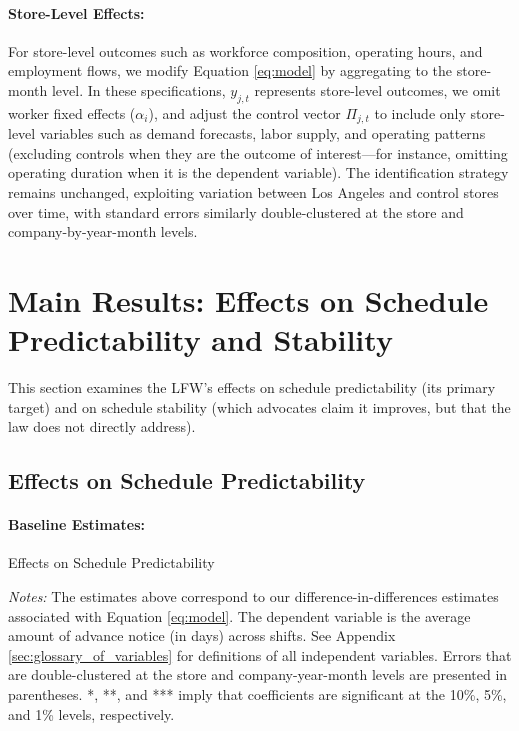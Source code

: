 \documentclass[letterpaper,11pt,leqno]{article}
\theoremstyle{paper}
\newcommand{\note}[2][]{\parbox{\textwidth}{\footnotesize\vspace*{10pt}\textit{#1}#2}}
\begin{document}
\paragraph{Store-Level Effects:}
For store-level outcomes such as workforce composition, operating hours, and employment flows, we modify Equation \ref{eq:model} by aggregating to the store-month level. In these specifications, $y_{j,t}$ represents store-level outcomes, we omit worker fixed effects ($\alpha_i$), and adjust the control vector $\Pi_{j,t}$ to include only store-level variables such as demand forecasts, labor supply, and operating patterns (excluding controls when they are the outcome of interest—for instance, omitting operating duration when it is the dependent variable). The identification strategy remains unchanged, exploiting variation between Los Angeles and control stores over time, with standard errors similarly double-clustered at the store and company-by-year-month levels.


\section{Main Results: Effects on Schedule Predictability and Stability} \label{sec:main_results}

This section examines the LFW's effects on schedule predictability (its primary target) and on schedule stability (which advocates claim it improves, but that the law does not directly address).

\subsection{Effects on Schedule Predictability} \label{subsec:advance_notice}

\paragraph{Baseline Estimates:}

\begin{singlespace}
\begin{table}[h]
\caption{Effects on Schedule Predictability}

\scriptsize 
\note{\textit{Notes: } The estimates above correspond to our difference-in-differences estimates associated with Equation \ref{eq:model}. The dependent variable is the average amount of advance notice (in days) across shifts. See Appendix \ref{sec:glossary_of_variables} for definitions of all independent variables. Errors that are double-clustered at the store and company-year-month levels are presented in parentheses. *, **, and *** imply that coefficients are significant at the 10\%, 5\%, and 1\% levels, respectively.}
\label{table:adv_notice}
\end{table}
\end{singlespace}
\end{document}

